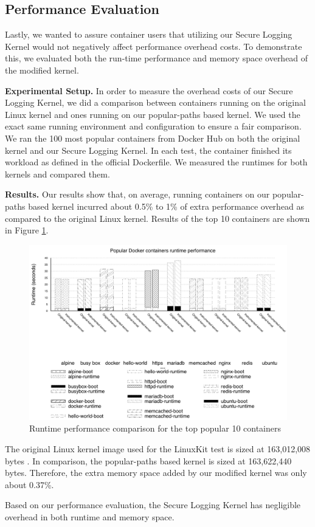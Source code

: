 \subsection{Performance Evaluation}
\label{sec.evaluation.performance} 
Lastly, we wanted to assure container users that utilizing our Secure Logging Kernel  would not negatively affect performance overhead costs. 
To demonstrate this, we evaluated both the run-time performance and memory space overhead of the modified kernel.

\textbf{Experimental Setup.}
In order to measure the overhead costs of our Secure Logging Kernel, 
we did a comparison between containers running on the original Linux kernel and ones running on our popular-paths based kernel. 
We used the exact same running environment and configuration to ensure a fair comparison. 
We ran the 100 most popular containers from Docker Hub on both the original kernel and our Secure Logging Kernel. 
In each test, the container finished its workload as defined in the official Dockerfile. We measured the runtimes for both kernels and compared them. 

\textbf{Results.}
Our results show that, on average, running containers on our popular-paths based kernel incurred about 0.5\% to 1\% of extra performance overhead as compared to the original Linux kernel. Results of the top 10 containers are shown in Figure \ref{fig:performance}.

\begin{figure}
\centering
\includegraphics[width=1.5\columnwidth]{diagram/performance.png}
\caption{\small Runtime performance comparison for the top popular 10 containers}
\label{fig:performance}
\end{figure}

The original Linux kernel image used for the  LinuxKit test  is sized at 163,012,008 bytes . 
In comparison, the popular-paths based kernel is sized at 163,622,440 bytes. Therefore, the extra memory space added by our modified kernel was only about 0.37\%. 

Based on our performance evaluation, the Secure Logging Kernel has negligible overhead in both runtime and memory space. 